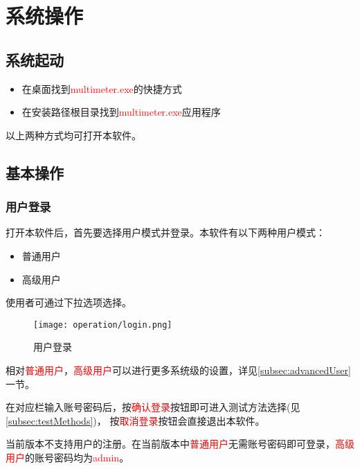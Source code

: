 \chapter{系统操作}
\section{系统起动}
\begin{itemize}
    \item 在桌面找到\textcolor{red}{multimeter.exe}的快捷方式
    \item 在安装路径根目录找到\textcolor{red}{multimeter.exe}应用程序
\end{itemize}
以上两种方式均可打开本软件。
\section{基本操作}
\subsection{用户登录}
打开本软件后，首先要选择用户模式并登录。本软件有以下两种用户模式：
\begin{itemize}
    \item 普通用户
    \item 高级用户
\end{itemize}
使用者可通过下拉选项选择。
\begin{figure}[htbp]
    \centering
    \texttt{[image: operation/login.png]}
    \caption{ 用户登录 \label{fig:login}}
\end{figure}
相对\textcolor{red}{普通用户}，\textcolor{red}{高级用户}可以进行更多系统级的设置，详见\ref{subsec:advancedUser}一节。

在对应栏输入账号密码后，按\textcolor{red}{确认登录}按钮即可进入测试方法选择(见\ref{subsec:testMethods})，
按\textcolor{red}{取消登录}按钮会直接退出本软件。
\begin{note}
    当前版本不支持用户的注册。在当前版本中\textcolor{red}{普通用户}无需账号密码即可登录，\textcolor{red}{高级用户}的账号密码均为\textcolor{red}{admin}。
\end{note}
